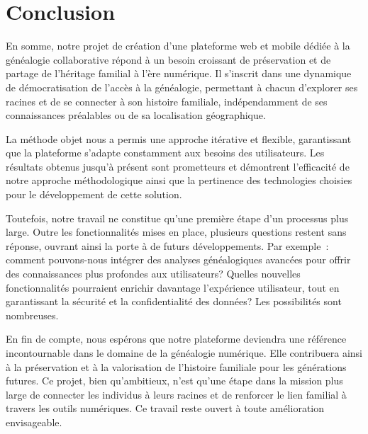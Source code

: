 \chapter*{Conclusion}
\label{chap:conclusion}
En somme, notre projet de création d’une plateforme web et mobile dédiée à la
généalogie collaborative répond à un besoin croissant de préservation et de
partage de l’héritage familial à l’ère numérique. Il s’inscrit dans une
dynamique de démocratisation de l’accès à la généalogie, permettant à chacun
d’explorer ses racines et de se connecter à son histoire familiale,
indépendamment de ses connaissances préalables ou de sa localisation
géographique.

La méthode objet nous a permis une approche itérative et flexible,
garantissant que la plateforme s’adapte constamment aux besoins des
utilisateurs. Les résultats obtenus jusqu’à présent sont prometteurs et
démontrent l’efficacité de notre approche méthodologique ainsi que la
pertinence des technologies choisies pour le développement de cette solution.

Toutefois, notre travail ne constitue qu’une première étape d’un processus plus
large. Outre les fonctionnalités mises en place, plusieurs questions restent
sans réponse, ouvrant ainsi la porte à de futurs développements. Par exemple :
comment pouvons-nous intégrer des analyses généalogiques avancées pour offrir
des connaissances plus profondes aux utilisateurs? Quelles nouvelles fonctionnalités
pourraient enrichir davantage l’expérience utilisateur, tout en garantissant
la sécurité et la confidentialité des données? Les possibilités sont nombreuses.

En fin de compte, nous espérons que notre plateforme deviendra une référence
incontournable dans le domaine de la généalogie numérique. Elle contribuera
ainsi à la préservation et à la valorisation de l’histoire familiale pour les
générations futures. Ce projet, bien qu’ambitieux, n’est qu’une étape dans la
mission plus large de connecter les individus à leurs racines et de renforcer
le lien familial à travers les outils numériques. Ce travail reste ouvert à
toute amélioration envisageable.
